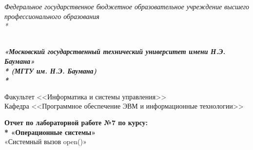 \newpage\Large
\begin{titlepage}
	\thispagestyle{empty}
	
	{\large
		\begin{center}
			\textsl{Федеральное государственное бюджетное образовательное учреждение высшего профессионального образования \\* }	
			\vspace{2em}
		\end{center}
	}
	{
		\begin{minipage}[t]{0.13\textwidth}
			\centering{}
			\label{fig0}
		\end{minipage}\hfill
		\begin{minipage}[t]{0.65\textwidth}
			\begin{center}
				\large  \textsl{\textbf {\\ «Московский государственный технический университет имени Н.Э. Баумана» \\* (МГТУ им. Н.Э. Баумана) \\* }}
			\end{center}
		\end{minipage}
	}
	
	\vspace{2em}
	
	\hrulefill
	
	\begin{center}
		\vspace{0pt plus2fill} %
		{\large
			Факультет  <<Информатика и системы управления>>\\
			Кафедра  <<Программное обеспечение ЭВМ и информационные технологии>>
		}
	\end{center}
	
	{\Large
		\begin{center}
			\textbf{Отчет по лабораторной работе №7 по курсу: \\*  «Операционные системы»} \\
			«Системный вызов open()»
		\end{center}
	}
	\vspace{0pt plus4fill} %
	

\end{titlepage}
